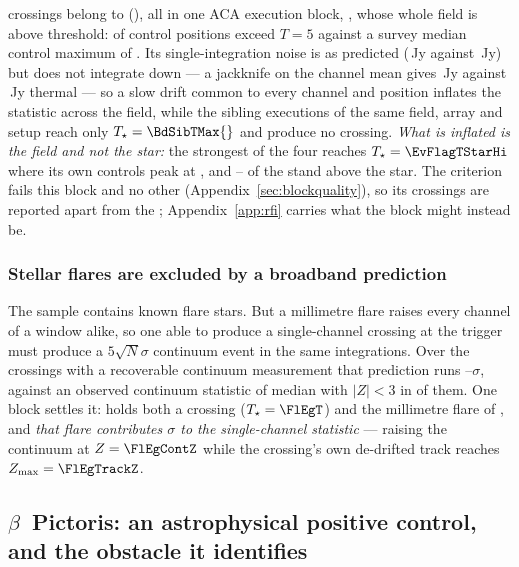\BdNCross{} crossings belong to \BdStar{} (\BdAlias), all in one ACA execution
block, \texttt{\BdBlock}, whose whole field is above threshold:
\BdNCtrlAbove{} of \BdNCtrl{} control positions exceed $T=5$ against a survey
median control maximum of \BdSurvCtrlMed. Its single-integration noise is as
predicted (\BdRmsMeas\,Jy against \BdRmsPred\,Jy) but does not integrate down
--- a jackknife on the channel mean gives \BdJack\,Jy against
\BdThermal\,Jy thermal --- so a slow drift common to every channel and
position inflates the statistic across the field, while the \BdNSibling{}
sibling executions of the same field, array and setup reach only
$T_\star=\BdSibTMax{}$ and produce no crossing. \emph{What is inflated is the
field and not the star:} the strongest of the four reaches
$T_\star=\EvFlagTStarHi$ where its own controls peak at \EvFlagCtrlAtHi, and
\EvFlagNgeLo--\EvFlagNgeHi{} of the \BdNCtrl{} stand above the star. The
criterion fails this block and no other
(Appendix~\ref{sec:blockquality}), so its \BdNCross{} crossings are reported
apart from the \EvNCrossQp{}; Appendix~\ref{app:rfi} carries what the block
might instead be.

\subsubsection{Stellar flares are excluded by a broadband prediction}

The sample contains known flare stars. But a millimetre flare raises every
channel of a window alike, so one able to produce a single-channel crossing at
the trigger must produce a $5\sqrt{N}\sigma$ continuum event in the same
integrations. Over the \FlNCont{} crossings with a recoverable continuum
measurement that prediction runs \FlPredLo--\FlPredHi$\sigma$, against an
observed continuum statistic of median \FlObsMed{} with $|Z|<3$ in \FlNQuiet{}
of them. One block settles it: \FlEgStar{} \texttt{\FlEgEb} holds both a
crossing ($T_\star=\FlEgT$) and the millimetre flare of
\citet{MacGregor2020}, and \emph{that flare contributes \FlEgContrib$\sigma$
to the single-channel statistic} --- raising the continuum at $Z=\FlEgContZ$
while the crossing's own de-drifted track reaches $Z_{\max}=\FlEgTrackZ$.

\subsection{$\beta$~Pictoris: an astrophysical positive control, and the
obstacle it identifies} \label{sec:bpicval}

